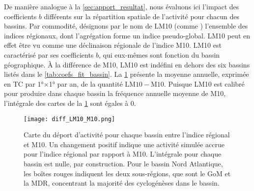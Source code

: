 \documentclass[../main.tex]{subfiles}
\begin{document}
De manière analogue à la \cref{sec:apport_resultat}, nous évaluons ici l'impact des coefficients $b$ différents sur la répartition spatiale de l'activité pour
chacun des bassins. Par commodité, désignons par le nom de LM10 (comme ) l'ensemble des indices régionaux, dont l'agrégation forme un indice
pseudo-global. LM10 peut en effet être vu comme une déclinaison régionale de l'indice M10. LM10 est caractérisé par ses coefficients $b$, qui eux-mêmes sont
fonction du bassin géographique. À la différence de M10, LM10 est indéfini en dehors des six bassins listés dans le \cref{tab:coefs_fit_bassin}. La
\cref{fig:diff_LM10_M10} présente la moyenne annuelle, exprimée en TC par \ang{1}$\times$\ang{1} par an, de la quantité $\mathrm{LM10} - \mathrm{M10}$. Puisque
LM10 est calibré pour produire dans chaque bassin la fréquence annuelle moyenne de M10, l'intégrale des cartes de la \cref{fig:diff_LM10_M10} sont égales à
\num{0}.

\begin{figure}[tp]
    \centering
    \texttt{[image: diff\_LM10\_M10.png]}
    \caption{Carte du déport d'activité pour chaque bassin entre l'indice régional et M10. Un changement positif indique une activité simulée accrue pour l'indice
    régional par rapport à M10. L'intégrale pour chaque bassin est nulle, par construction. Pour le bassin Nord Atlantique, les boîtes rouges indiquent les deux
    sous-régions, que sont le GoM et la MDR, concentrant la majorité des cyclogénèses dans le bassin.}
    \label{fig:diff_LM10_M10}
\end{figure}
\end{document}
